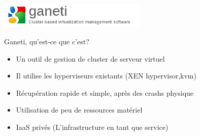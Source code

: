 

%

\begin{frame}
  \begin{center}
   \includegraphics[width=200pt]{images/logo_ganeti.png}
  \end{center}
\end{frame}

\begin{frame}{Ganeti, qu'est-ce que c'est?}
\begin{itemize}
\item Un outil de gestion de cluster de serveur virtuel

\item Il utilise les hyperviseurs existants (XEN hypervisor,kvm)

\item Récupération rapide et simple, après des crashs physique

\item Utilisation de peu de ressources matériel

\item IaaS privés (L'infrastructure en tant que service)
\end{itemize}
\end{frame}



